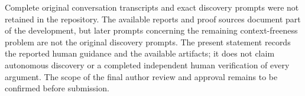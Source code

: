 \documentclass[a4paper,USenglish,cleveref,autoref]{lipics-v2021}
\begin{document}
Complete original conversation transcripts and exact discovery prompts were not retained in the repository.
The available reports and proof sources document part of the development, but later prompts concerning the remaining context-freeness problem are not the original discovery prompts.
The present statement records the reported human guidance and the available artifacts; it does not claim autonomous discovery or a completed independent human verification of every argument.
The scope of the final author review and approval remains to be confirmed before submission.


\end{document}
